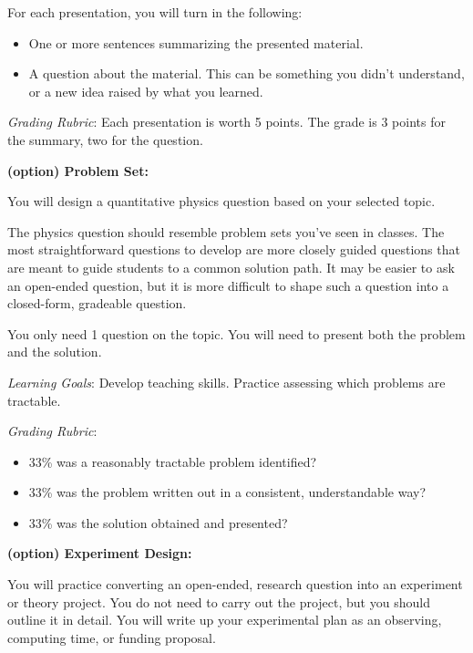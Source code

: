 \documentclass{article}
\begin{document}
For each presentation, you will turn in the following:
\begin{itemize}
    \item One or more sentences summarizing the presented material.
    \item A question about the material.  This can be something you didn't
    understand, or a new idea raised by what you learned.
\end{itemize}

\textit{Grading Rubric}:
Each presentation is worth 5 points.
The grade is 3 points for the summary, two for the question.

\noindent \textbf{(option) Problem Set:}

You will design a quantitative physics question based on your selected topic.

The physics question should resemble problem sets you've seen in classes.
The most straightforward questions to develop are more closely guided questions that are meant to
guide students to a common solution path.
It may be easier to ask an open-ended question, but it is more difficult to shape
such a question into a closed-form, gradeable question.

You only need 1 question on the topic.  
You will need to present both the problem and the solution.

\textit{Learning Goals}:
    Develop teaching skills.  Practice assessing which problems are tractable.

\textit{Grading Rubric}:
\begin{itemize}
    \item 33\% was a reasonably tractable problem identified?
    \item 33\% was the problem written out in a consistent, understandable way?
    \item 33\% was the solution obtained and presented?
\end{itemize}

\noindent \textbf{(option) Experiment Design:}

You will practice converting an open-ended, research question into an 
experiment or theory project.
You do not need to carry out the project, but you should outline it in
detail.
You will write up your experimental plan as an observing, computing time,
or funding proposal.
\end{document}
